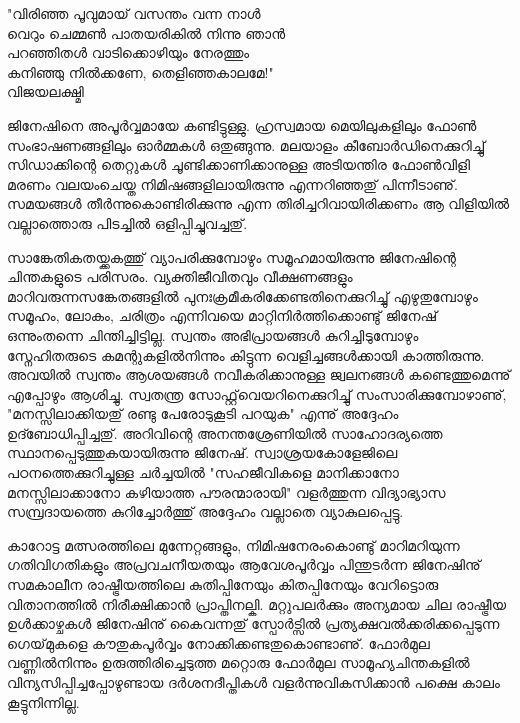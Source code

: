 ﻿
{\vskip 2pt}

\hspace*{6em}\parbox{6cm}{
"വിരിഞ്ഞ പൂവുമായ് വസന്തം വന്ന നാള്‍\\
വെറും ചെമ്മണ്‍ പാതയരികില്‍ നിന്നു ഞാന്‍\\
പറഞ്ഞിതള്‍ വാടിക്കൊഴിയും നേരത്തും\\
കനിഞ്ഞു നില്‍ക്കണേ, തെളിഞ്ഞകാലമേ!"\\
\hspace*{12em}വിജയലക്ഷ്മി
}

{\vskip 12pt}

ജിനേഷിനെ അപൂര്‍വ്വമായേ കണ്ടിട്ടുള്ളു. ഹ്രസ്വമായ മെയിലുകളിലും ഫോണ്‍ സംഭാഷണങ്ങളിലും ഓര്‍മ്മകള്‍ ഒതുങ്ങുന്നു. മലയാളം കീബോര്‍ഡിനെക്കുറിച്ചു് സിഡാക്കിന്റെ തെറ്റുകള്‍ ചൂണ്ടിക്കാണിക്കാനുള്ള അടിയന്തിര ഫോണ്‍വിളി മരണം വലയംചെയ്ത നിമിഷങ്ങളിലായിരുന്നു എന്നറിഞ്ഞതു് പിന്നീടാണു്. സമയങ്ങള്‍ തീര്‍ന്നുകൊണ്ടിരിക്കുന്നു എന്ന തിരിച്ചറിവായിരിക്കണം ആ വിളിയില്‍ വല്ലാത്തൊരു പിടച്ചില്‍ ഒളിപ്പിച്ചുവച്ചതു്.

സാങ്കേതികതയ്ക്കകത്തു് വ്യാപരിക്കുമ്പോഴും സമൂഹമായിരുന്നു ജിനേഷിന്റെ ചിന്തകളുടെ പരിസരം. വ്യക്തിജീവിതവും വീക്ഷണങ്ങളും മാറിവരുന്നസങ്കേതങ്ങളില്‍ പുനഃക്രമീകരിക്കേണ്ടതിനെക്കുറിച്ചു് എഴുതുമ്പോഴും സമൂഹം, ലോകം, ചരിത്രം എന്നിവയെ മാറ്റിനിര്‍ത്തിക്കൊണ്ടു് ജിനേഷ് ഒന്നുംതന്നെ ചിന്തിച്ചിട്ടില്ല. സ്വന്തം അഭിപ്രായങ്ങള്‍ കുറിച്ചിടുമ്പോഴും സ്നേഹിതരുടെ കമന്റുകളില്‍നിന്നും കിട്ടുന്ന വെളിച്ചങ്ങള്‍ക്കായി കാത്തിരുന്നു. അവയില്‍ സ്വന്തം ആശയങ്ങള്‍ നവീകരിക്കാനുള്ള ജ്വലനങ്ങള്‍ കണ്ടെത്തുമെന്നു് എപ്പോഴും ആശിച്ചു. സ്വതന്ത്ര സോഫ്റ്റ്‌വെയറിനെക്കുറിച്ചു് സംസാരിക്കുമ്പോഴാണു്, "മനസ്സിലാക്കിയതു് രണ്ടു പേരോടുകൂടി പറയുക" എന്നു് അദ്ദേഹം ഉദ്ബോധിപ്പിച്ചതു്. അറിവിന്റെ അനന്തശ്രേണിയില്‍ സാഹോദര്യത്തെ സ്ഥാനപ്പെടുത്തുകയായിരുന്നു ജിനേഷ്. സ്വാശ്രയകോളേജിലെ പഠനത്തെക്കുറിച്ചുള്ള ചര്‍ച്ചയില്‍ "സഹജീവികളെ മാനിക്കാനോ മനസ്സിലാക്കാനോ കഴിയാത്ത പൗരന്മാരായി" വളര്‍ത്തുന്ന വിദ്യാഭ്യാസ സമ്പ്രദായത്തെ കുറിച്ചോര്‍ത്തു് അദ്ദേഹം വല്ലാതെ വ്യാകുലപ്പെട്ടു.

കാറോട്ട മത്സരത്തിലെ മുന്നേറ്റങ്ങളും, നിമിഷനേരംകൊണ്ടു് മാറിമറിയുന്ന ഗതിവിഗതികളും അപ്രവചനീയതയും ആവേശപൂര്‍വ്വം പിന്തുടര്‍ന്ന ജിനേഷിനു് സമകാലീന രാഷ്ട്രീയത്തിലെ കുതിപ്പിനേയും കിതപ്പിനേയും വേറിട്ടൊരു വിതാനത്തില്‍ നിരീക്ഷിക്കാന്‍ പ്രാപ്തിനല്കി. മറ്റുപലര്‍ക്കും അന്യമായ ചില രാഷ്ട്രീയ ഉള്‍ക്കാഴ്ചകള്‍ ജിനേഷിനു് കൈവന്നതു് സ്പോര്‍ട്സില്‍ പ്രത്യക്ഷവല്‍ക്കരിക്കപ്പെടുന്ന ഗെയ്‌മുകളെ കൗതുകപൂര്‍വ്വം നോക്കിക്കണ്ടതുകൊണ്ടാണു്. ഫോര്‍മുല വണ്ണില്‍നിന്നും ഉരുത്തിരിച്ചെടുത്ത മറ്റൊരു ഫോര്‍മുല സാമൂഹ്യചിന്തകളില്‍ വിന്യസിപ്പിച്ചപ്പോഴുണ്ടായ ദര്‍ശനദീപ്തികള്‍ വളര്‍ന്നുവികസിക്കാന്‍ പക്ഷെ കാലം കൂട്ടുനിന്നില്ല.


